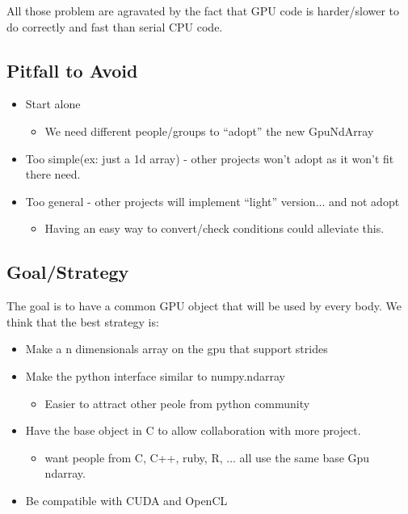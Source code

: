 \documentclass{article} %
\begin{document}
All those problem are agravated by the fact that GPU code is
harder/slower to do correctly and fast than serial CPU code.

\subsection{Pitfall to Avoid}
\begin{itemize}
\item Start alone
  \begin{itemize}
  \item We need different people/groups to ``adopt'' the new GpuNdArray
  \end{itemize}
\item Too simple(ex: just a 1d array) - other projects won't adopt as it won't fit there need.
\item Too general - other projects will implement ``light'' version... and not adopt
  \begin{itemize}
  \item Having an easy way to convert/check conditions could alleviate this.
  \end{itemize}
\end{itemize}

\subsection{Goal/Strategy}
The goal is to have a common GPU object that will be used by every body. We think that the best strategy is:

\begin{itemize}
\item Make a n dimensionals array on the gpu that support strides
\item Make the python interface similar to numpy.ndarray
  \begin{itemize}
  \item Easier to attract other peole from python community
  \end{itemize}
\item Have the base object in C to allow collaboration with more project.
  \begin{itemize}
  \item  want people from C, C++, ruby, R, ... all use the same base Gpu ndarray.
  \end{itemize}
\item Be compatible with CUDA and OpenCL
\end{itemize}
\end{document}
